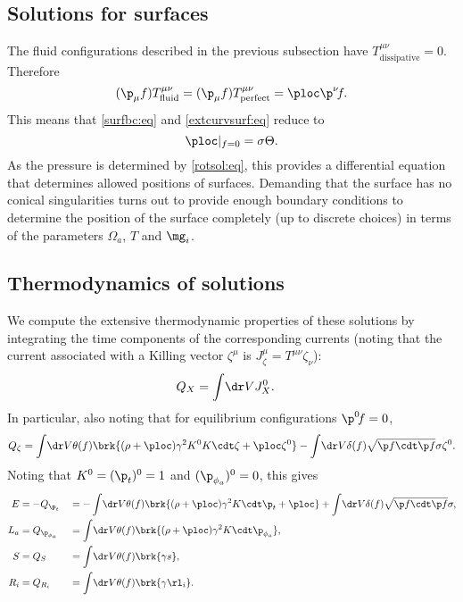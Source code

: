 \subsection{Solutions for surfaces}\label{sec:rotsurf}

The fluid configurations described in the previous subsection have $T^{\mu\nu}_\mathrm{dissipative}=0$. Therefore
%
\begin{equation*}
  (\p_\mu f) T^{\mu\nu}_\text{fluid} = (\p_\mu f) T^{\mu\nu}_\text{perfect} = \ploc \p^\nu\! f.
\end{equation*}
%
This means that \eqref{surfbc:eq} and \eqref{extcurvsurf:eq} reduce to
%
\begin{equation}\label{rotsurfbc:eq}
  \ploc|_{f=0} = \sigma \Theta.
\end{equation}
%
As the pressure is determined by \eqref{rotsol:eq}, this provides a differential equation that determines allowed positions of surfaces. Demanding that the surface has no conical singularities turns out to provide enough boundary conditions to determine the position of the surface completely (up to discrete choices) in terms of the parameters $\Omega_a$, $T$ and $\mg_i$.

\subsection{Thermodynamics of solutions}\label{sec:rottherm}

We compute the extensive thermodynamic properties of these solutions by integrating the time components of the corresponding currents (noting that the current associated with a Killing vector $\zeta^\mu$ is $J^\mu_\zeta = T^{\mu\nu}\zeta_\nu$):
%
\begin{equation}\label{noetherch:eq}
 \begin{split}
  Q_X &= \int\!\dr V J^0_X.
 \end{split}
\end{equation}
%
In particular, also noting that for equilibrium configurations $\p^0\!f=0$,
%
\begin{equation}\label{killingcharge:eq}
  Q_\zeta = \int\!\dr V \theta(f)\brk{(\rho+\ploc)\gamma^2 K^0 K\cdt\zeta
   + \ploc \zeta^0 } - \int\!\dr V \delta(f) \sqrt{\p f\cdt\p f} \sigma \zeta^0.
\end{equation}
%
Noting that $K^0=(\p_t)^0=1$ and $(\p_{\phi_a})^0=0$, this gives
%
\begin{equation}\label{thermcharge:eq}
  \begin{aligned}
    E &= -Q_{\p_t}& &= -\int\!\dr V \theta(f)\brk{
           (\rho+\ploc)\gamma^2 K\cdt\p_t +\ploc}
       + \int\!\dr V \delta(f) \sqrt{\p f\cdt\p f} \sigma, \\
    L_a &= Q_{\p_{\phi_a}}& &= \int\!\dr V \theta(f)\brk{
          (\rho+\ploc)\gamma^2 K\cdt \p_{\phi_a}},\\
    S &= Q_S& &= \int\!\dr V \theta(f)\brk{\gamma s},\\
    R_i &= Q_{R_i}& &= \int\!\dr V \theta(f)\brk{\gamma \rl_i}.\\
  \end{aligned}
\end{equation}
%


